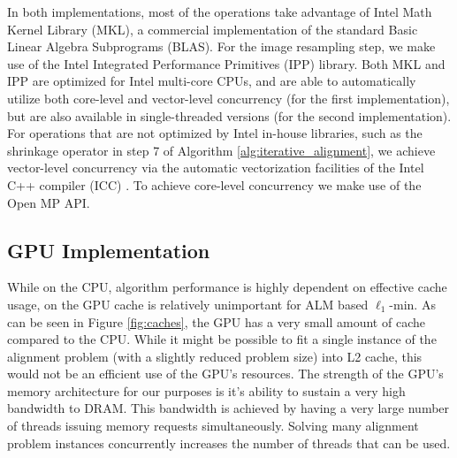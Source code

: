 \documentclass[10pt,twocolumn,letterpaper]{article}
\begin{document}


In both implementations, most of the operations take
advantage of Intel Math Kernel Library (MKL), a commercial implementation of
the standard Basic Linear Algebra Subprograms (BLAS). For the image resampling
step, we make use of the Intel Integrated Performance Primitives (IPP) library.
Both MKL and IPP are optimized for Intel multi-core CPUs, and are able to
automatically utilize both core-level and vector-level concurrency (for the first implementation),
but are also available in single-threaded versions (for the second implementation). For 
operations that are not optimized by Intel in-house libraries, such as the shrinkage
operator in step 7 of Algorithm \ref{alg:iterative_alignment}, we achieve 
vector-level concurrency via
the automatic vectorization facilities of the Intel C++ compiler (ICC) \cite{dulong1999overview}.
To achieve core-level concurrency we make use of the Open MP API. \cite{dagum2002openmp} 

\subsection{GPU Implementation}
\label{sec:alignment_implementation_gpu}
While on the CPU, algorithm performance is highly dependent on effective
cache usage, on the GPU cache is relatively unimportant for ALM based
$\ell_1$-min.  As can be seen in Figure \ref{fig:caches}, the GPU has 
a very small amount of cache compared to the CPU.  While it might be possible
to fit a single instance of the alignment problem (with a slightly reduced problem size)
into L2 cache, this would not be an efficient use of the GPU's resources.
The strength of the GPU's memory architecture for our purposes is it's ability to sustain a very
high bandwidth to DRAM.  This bandwidth is achieved by having a very large number of
threads issuing memory requests simultaneously.  Solving many alignment problem instances
concurrently increases the number of threads that can be used.
\end{document}

